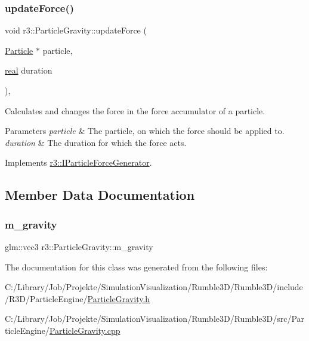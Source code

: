 \subsubsection{\texorpdfstring{update\+Force()}{updateForce()}}
{\footnotesize\ttfamily void r3\+::\+Particle\+Gravity\+::update\+Force (\begin{DoxyParamCaption}\item[{\mbox{\hyperlink{classr3_1_1_particle}{Particle}} $\ast$}]{particle,  }\item[{\mbox{\hyperlink{namespacer3_ab2016b3e3f743fb735afce242f0dc1eb}{real}}}]{duration }\end{DoxyParamCaption})\hspace{0.3cm}{\ttfamily [override]}, {\ttfamily [virtual]}}



Calculates and changes the force in the force accumulator of a particle. 


\begin{DoxyParams}{Parameters}
{\em particle} & The particle, on which the force should be applied to. \\
\hline
{\em duration} & The duration for which the force acts. \\
\hline
\end{DoxyParams}


Implements \mbox{\hyperlink{classr3_1_1_i_particle_force_generator_a8b692fc3a40f815dc44c106b451c3a90}{r3\+::\+I\+Particle\+Force\+Generator}}.



\subsection{Member Data Documentation}
\mbox{\label{classr3_1_1_particle_gravity_a4e21b444ed08aa8c66ca40a11f34c384}} 
\subsubsection{\texorpdfstring{m\+\_\+gravity}{m\_gravity}}
{\footnotesize\ttfamily glm\+::vec3 r3\+::\+Particle\+Gravity\+::m\+\_\+gravity\hspace{0.3cm}{\ttfamily [protected]}}



The documentation for this class was generated from the following files\+:\begin{DoxyCompactItemize}
\item 
C\+:/\+Library/\+Job/\+Projekte/\+Simulation\+Visualization/\+Rumble3\+D/\+Rumble3\+D/include/\+R3\+D/\+Particle\+Engine/\mbox{\hyperlink{_particle_gravity_8h}{Particle\+Gravity.\+h}}\item 
C\+:/\+Library/\+Job/\+Projekte/\+Simulation\+Visualization/\+Rumble3\+D/\+Rumble3\+D/src/\+Particle\+Engine/\mbox{\hyperlink{_particle_gravity_8cpp}{Particle\+Gravity.\+cpp}}\end{DoxyCompactItemize}

